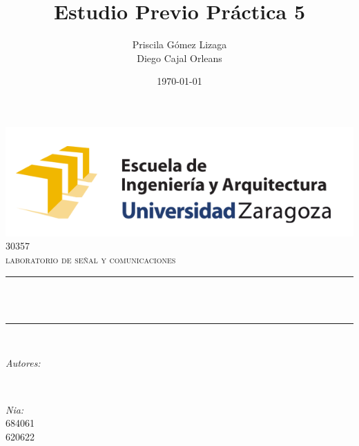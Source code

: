 \documentclass[12pt]{article}
\title{Estudio Previo Práctica 5}
\author{Priscila Gómez Lizaga \\ Diego Cajal Orleans}
\date{\today}
\makeatletter
\let\thetitle\@title
\let\theauthor\@author
\let\thedate\@date
\makeatother
\begin{document}

\begin{titlepage}
	\centering
    \vspace*{0.5 cm}
    \includegraphics[scale = 0.75]{eina.png}\\[1.0 cm]	%
	\textsc{\Large 30357}\\[0.5 cm]				%
	\textsc{\large laboratorio de señal y comunicaciones}\\[0.5 cm]				%
	\rule{\linewidth}{0.2 mm} \\[0.4 cm]
	\setlength{\baselineskip}{2\baselineskip}
	{ \huge \bfseries \thetitle}\\
	\rule{\linewidth}{0.2 mm} \\[1.5 cm]
	
	\begin{minipage}{0.4\textwidth}
		\begin{flushleft} \large
			\emph{Autores:}\\
			\theauthor
			\end{flushleft}
			\end{minipage}~
			\begin{minipage}{0.4\textwidth}
			\begin{flushright} \large
			\emph{Nia:} \\
			684061 \\
			620622
		\end{flushright}
	\end{minipage}\\[2 cm]
	
	{\large \thedate}\\[2 cm]
 
	\vfill
	
\end{titlepage}

\end{document}
